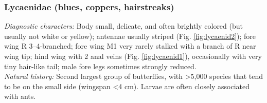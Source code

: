 \documentclass[letterpaper, 11pt]{article}
\begin{document}
\subsubsection{Lycaenidae (blues, coppers, hairstreaks)}
\noindent{}\textit{Diagnostic characters:} Body small, delicate, and often brightly colored (but usually not white or yellow); antennae usually striped (Fig. \ref{fig:lycaenid2}); fore wing R 3--4-branched; fore wing M1 very rarely stalked with a branch of R near wing tip; hind wing with 2 anal veins (Fig. \ref{fig:lycaenid1}), occasionally with very tiny hair-like tail; male fore legs sometimes strongly reduced.\\

\noindent{}\textit{Natural history:} Second largest group of butterflies, with \textgreater{}5,000 species that tend to be on the small side (wingspan \textless4 cm). Larvae are often closely associated with ants. 
\end{document}
